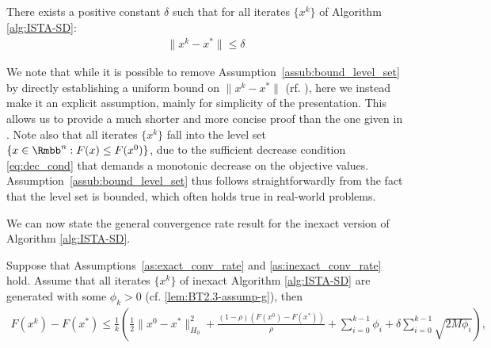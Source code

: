 \documentclass[11pt]{article}
\numberwithin{equation}{section}
\begin{document}
\begin{assumption}\leavevmode %
\label{as:inexact_conv_rate}
	\assume
	\label{assub:bound_level_set}
	There exists a positive constant $\delta$ such that for all iterates $\{x^k\}$ of Algorithm \ref{alg:ISTA-SD}:
	\begin{align*}
	     \|x^k - x^*\| \leq \delta
	\end{align*} 
\end{assumption}
We note that while it is possible to remove Assumption~\ref{assub:bound_level_set} by directly establishing a uniform bound on $\|x^k - x^*\|$ (rf. \cite{OML,Schmidtetal}), here we instead make it an explicit assumption, mainly for simplicity of the presentation. This allows us to provide a much shorter and more concise proof than the one given in \cite{OML}. 
Note also that all iterates $\{x^k\}$ fall into the level set $\{x \in \Rmbb^n: F(x) \leq F(x^0)\}$, due to the sufficient decrease condition \eqref{eq:dec_cond} that demands a monotonic decrease on the objective values. Assumption~\ref{assub:bound_level_set} thus follows straightforwardly from the fact that the level set is bounded, which often holds true in real-world problems.

We can now state the general convergence rate result for the inexact version of Algorithm \ref{alg:ISTA-SD}.

\begin{theorem}\label{th:inexact_conv_rate}
Suppose that Assumptions~\ref{as:exact_conv_rate} and \ref{as:inexact_conv_rate} hold. 
Assume that all iterates $\{x^k\}$ of inexact Algorithm \ref{alg:ISTA-SD} are generated with some $\phi_k>0$ (cf. \eqref{lem:BT2.3-assump-g}), then
\begin{align}
    \label{eq:bound_F_F*}
    F(x^k) - F(x^*) \leq \frac{1}{k} \left( \frac{1}{2}  \|x^0-x^*\|_{H_0}^2 + \frac{(1-\rho)(F(x^0)-F(x^*))}{\rho} + \sum_{i=0}^{k-1}\phi_i + \delta\sum_{i=0}^{k-1} \sqrt{2M\phi_i} \right),
\end{align}
\end{theorem}
\end{document}
